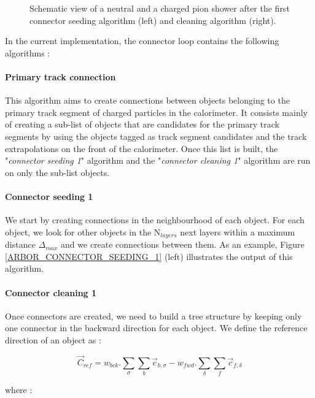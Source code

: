 \documentclass[12pt]{article}
\begin{document}
\begin{figure}[!h]
\begin{minipage}{0.49\linewidth}
\begin{center}
    \end{center}
  \end{minipage}
  \caption{\label{ARBOR_CONNECTOR_SEEDING_1} \label{ARBOR_CONNECTOR_CLEANING_1} Schematic view of a neutral and a charged pion shower after the first connector seeding algorithm (left) and cleaning algorithm (right).}
\end{figure}

In the current implementation, the connector loop contains the following algorithms :

\paragraph*{Primary track connection} This algorithm aims to create connections between objects belonging to the primary track segment of charged particles in the calorimeter. It consists mainly of creating a sub-list of objects that are candidates for the primary track segments by using the objects tagged as track segment candidates and the track extrapolations on the front of the calorimeter. Once this list is built, the "\textit{connector seeding 1}" algorithm and the "\textit{connector cleaning 1}" algorithm are run on only the sub-list objects.

\paragraph*{Connector seeding 1} We start by creating connections in the neighbourhood of each object. For each object, we look for other objects in the N$_{layers}$ next layers within a maximum distance $\Delta_{max}$ and we create connections between them. As an example, Figure \ref{ARBOR_CONNECTOR_SEEDING_1} (left) illustrates the output of this algorithm.

\paragraph*{Connector cleaning 1} Once connectors are created, we need to build a tree structure by keeping only one connector in the backward direction for each object. We define the reference direction of an object as :

\begin{equation}
  \vec{C}_{ref} = w_{bck} . \sum_\sigma \sum_b \vec{c}_{b,\sigma} - w_{fwd} . \sum_\delta \sum_f \vec{c}_{f,\delta}
\end{equation}

where :
\end{document}

